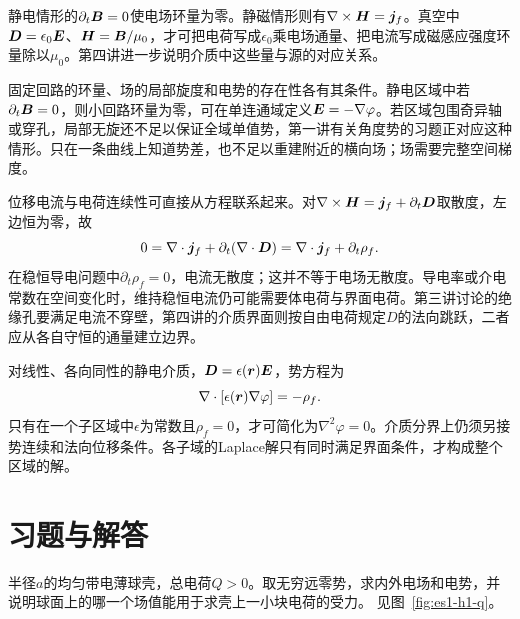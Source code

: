 静电情形的$\partial_t\bm{B}=0$使电场环量为零。静磁情形则有$\nabla\times\bm{H}=\bm{j}_f$。真空中$\bm{D}=\epsilon_0\bm{E}$、$\bm{H}=\bm{B}/\mu_0$，才可把电荷写成$\epsilon_0$乘电场通量、把电流写成磁感应强度环量除以$\mu_0$。第四讲进一步说明介质中这些量与源的对应关系。


固定回路的环量、场的局部旋度和电势的存在性各有其条件。静电区域中若$\partial_t\bm{B}=0$，则小回路环量为零，可在单连通域定义$\bm{E}=-\nabla\varphi$。若区域包围奇异轴或穿孔，局部无旋还不足以保证全域单值势，第一讲有关角度势的习题正对应这种情形。只在一条曲线上知道势差，也不足以重建附近的横向场；场需要完整空间梯度。

位移电流与电荷连续性可直接从方程联系起来。对$\nabla\times\bm{H}=\bm{j}_f+\partial_t\bm{D}$取散度，左边恒为零，故
\[0=\nabla\cdot\bm{j}_f+\partial_t(\nabla\cdot\bm{D})
=\nabla\cdot\bm{j}_f+\partial_t\rho_f.
\]
在稳恒导电问题中$\partial_t\rho_f=0$，电流无散度；这并不等于电场无散度。导电率或介电常数在空间变化时，维持稳恒电流仍可能需要体电荷与界面电荷。第三讲讨论的绝缘孔要满足电流不穿壁，第四讲的介质界面则按自由电荷规定$D$的法向跳跃，二者应从各自守恒的通量建立边界。

对线性、各向同性的静电介质，$\bm{D}=\epsilon(\bm{r})\bm{E}$，势方程为
\[\nabla\cdot[\epsilon(\bm{r})\nabla\varphi]=-\rho_f.
\]
只有在一个子区域中$\epsilon$为常数且$\rho_f=0$，才可简化为$\nabla^2\varphi=0$。介质分界上仍须另接势连续和法向位移条件。各子域的Laplace解只有同时满足界面条件，才构成整个区域的解。




\section{习题与解答}

\begin{exercise}[球壳上的势与场]\label{ex:es1-h1}
半径$a$的均匀带电薄球壳，总电荷$Q>0$。取无穷远零势，求内外电场和电势，并说明球面上的哪一个场值能用于求壳上一小块电荷的受力。 见图~\ref{fig:es1-h1-q}。
\end{exercise}

